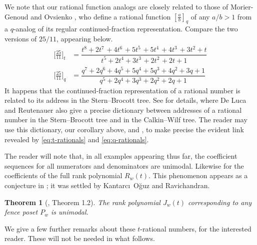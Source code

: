 \documentclass{amsart}
\newcommand{\Jfull}[1]{J_{#1}}
\newtheorem{theorem}{Theorem}%
\theoremstyle{definition}
\begin{document}
We note that our rational function analogs are closely related to those of  
Morier-Genoud and Ovsienko \cite{morier2020q-deformed}, who define a rational function $[\frac{a}{b}]_q$ of any $a/b>1$ from a $q$-analog of its regular continued-fraction representation. Compare the two versions of $25/11$, appearing below.
\begin{align}
\label{eq:t-rationals}
    \bigl[\tfrac{25}{11}\bigr]_t &= \dfrac{t^8+2t^{7\,}+4t^{6\,}+5t^{5\,}+5t^{4\,}+4t^{3\,}+3t^2+{t}}{t^{5}+2t^{4}+3t^{3\,}+2t^{2\,}+2{t}+1}
    \\[1ex]
\label{eq:q-rationals}
    \bigl[\tfrac{25}{11}\bigr]_q &= \dfrac{q^7+2q^6+4q^5+5q^4+5q^3+4q^2+3q+1}{q^5+2q^4+3q^3+2q^2+2q+1}
\end{align}
It happens that the continued-fraction representation of a rational number is related to its address in the Stern--Brocott tree. See \cite{deluca2011christoffel} for details, where De Luca and Reutenauer also give a precise dictionary between addresses of a rational number in the Stern--Brocott tree and in the Calkin--Wilf tree.
The reader may use this dictionary, our corollary above, and \cite[Cor.~1.7]{morier2020q-deformed}, to make precise the evident link revealed by \eqref{eq:t-rationals} and \eqref{eq:q-rationals}.


The reader will note that, in all examples appearing thus far, the coefficient sequences for all numerators and denominators are unimodal. Likewise for the coefficients of the full rank polynomial $R_w(t)$. 
This phenomenon appears as a conjecture in \cite{morier2020q-deformed}; it was settled by Kantarc{\i}~O\u{g}uz and Ravichandran.

\begin{theorem}[\cite{kantarci2023rank}, Theorem 1.2]
\label{th:rank-unimodal}
The rank polynomial $\Jfull{w}(t)$ corresponding to any fence poset $P_w$ is unimodal.
\end{theorem}

We give a few further remarks about these $t$-rational numbers, for the interested reader. These will not be needed in what follows.
\end{document}
